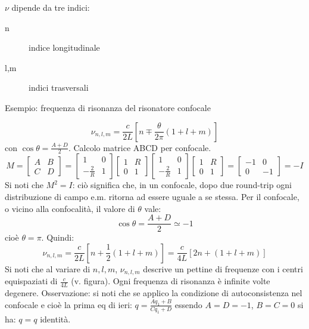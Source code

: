 \documentclass{book}
\theoremstyle{remark}
\begin{document}
\begin{enumerate}
$\nu$ dipende da tre indici:
\begin{description}
\item [n] indice longitudinale
\item [l,m] indici trasversali
\end{description}

\end{enumerate}

Esempio: frequenza di risonanza del risonatore confocale

\begin{equation*}
\nu_{n,l,m} = \frac{c}{2L} \left[n \mp \frac{\theta}{2\pi}(1+l+m)\right]
\end{equation*}
con $\cos\theta = \frac{A+D}{2}$.
Calcolo matrice ABCD per confocale.
\begin{equation*}
M = \begin{bmatrix}
A	&	B\\
C	&	D
\end{bmatrix}
=\begin{bmatrix}
1	&	0\\
-\frac{2}{R}	&	1
\end{bmatrix}\begin{bmatrix}
1	&	R\\
0	&	1
\end{bmatrix}\begin{bmatrix}
1	&	0\\
-\frac{2}{R}	&	1
\end{bmatrix}\begin{bmatrix}
1	&	R\\
0	&	1
\end{bmatrix}=\begin{bmatrix}
-1	&	0\\
0	&	-1
\end{bmatrix}=-I
\end{equation*}
Si noti che $M^2 = I$: ciò significa che, in un confocale, dopo due round-trip ogni distribuzione di campo e.m. ritorna ad essere uguale a se stessa.
Per il confocale, o vicino alla confocalità, il valore di $\theta$ vale:
\begin{equation*}
\cos\theta = \frac{A+D}{2}\simeq -1
\end{equation*}
cioè $\theta=\pi$. Quindi:
\begin{equation*}
\nu_{n,l,m} = \frac{c}{2L} \left[n + \frac{1}{2}(1+l+m)\right] = \frac{c}{4L} \left[2n + (1+l+m)\right]
\end{equation*}
Si noti che al variare di $n,l,m$, $\nu_{n,l,m}$ descrive un pettine di frequenze con i centri equispaziati di $\frac{c}{4L}$ (v. figura). Ogni frequenza di risonanza è infinite volte degenere.
Osservazione: si noti che se applico la condizione di autoconsistenza nel confocale e cioè la prima eq di ieri: $q = \frac{Aq_1 + B}{Cq_1 + D}$
essendo $A=D=-1$, $B=C=0$ si ha: $q=q$ identità.
\end{document}

